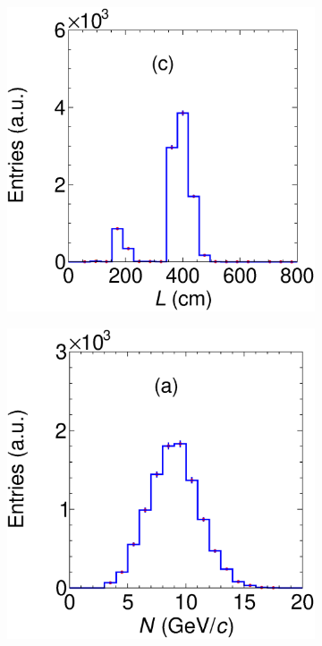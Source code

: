 \begin{figure}[t]
     \centering
     \begin{subfigure}[b]{0.48\textwidth}
         \centering
         \includegraphics[width=\textwidth]{figures/ch4-KF_NDGArLite/MC/LengthAllTall.eps}
         \caption{}
         \label{fig:MCGArLite_L}
     \end{subfigure}
     \begin{subfigure}[b]{0.48\textwidth}
         \centering
         \includegraphics[width=\textwidth]{figures/ch4-KF_NDGArLite/MC/NPointsAllTall.eps}

\end{subfigure}
\end{figure}
